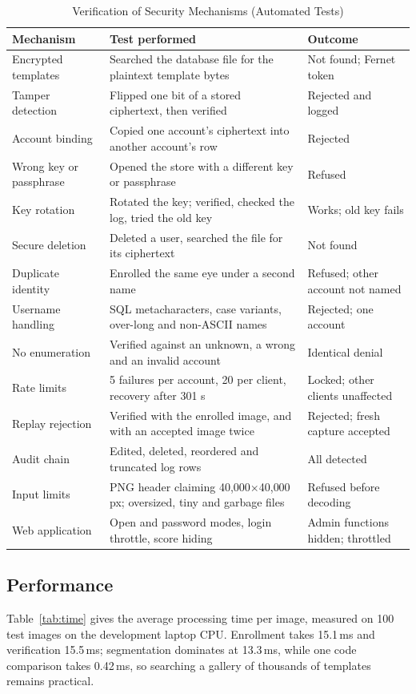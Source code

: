 \documentclass[conference]{IEEEtran}
\begin{document}
\begin{table}[!t]
\caption{Verification of Security Mechanisms (Automated Tests)}
\label{tab:security}
\centering\footnotesize
\begin{tabular}{L{0.25\columnwidth}L{0.40\columnwidth}L{0.27\columnwidth}}
\toprule
\textbf{Mechanism} & \textbf{Test performed} & \textbf{Outcome} \\
\midrule
Encrypted templates & Searched the database file for the plaintext template bytes & Not found; Fernet token \\
Tamper detection & Flipped one bit of a stored ciphertext, then verified & Rejected and logged \\
Account binding & Copied one account's ciphertext into another account's row & Rejected \\
Wrong key or passphrase & Opened the store with a different key or passphrase & Refused \\
Key rotation & Rotated the key; verified, checked the log, tried the old key & Works; old key fails \\
Secure deletion & Deleted a user, searched the file for its ciphertext & Not found \\
Duplicate identity & Enrolled the same eye under a second name & Refused; other account not named \\
Username handling & SQL metacharacters, case variants, over-long and non-ASCII names & Rejected; one account \\
No enumeration & Verified against an unknown, a wrong and an invalid account & Identical denial \\
Rate limits & 5 failures per account, 20 per client, recovery after 301 s & Locked; other clients unaffected \\
Replay rejection & Verified with the enrolled image, and with an accepted image twice & Rejected; fresh capture accepted \\
Audit chain & Edited, deleted, reordered and truncated log rows & All detected \\
Input limits & PNG header claiming 40{,}000$\times$40{,}000 px; oversized, tiny and garbage files & Refused before decoding \\
Web application & Open and password modes, login throttle, score hiding & Admin functions hidden; throttled \\
\bottomrule
\end{tabular}
\end{table}


\subsection{Performance}
Table~\ref{tab:time} gives the average processing time per image, measured on 100 test images on the development laptop CPU. Enrollment takes 15.1\,ms and verification 15.5\,ms; segmentation dominates at 13.3\,ms, while one code comparison takes 0.42\,ms, so searching a gallery of thousands of templates remains practical.
\end{document}
